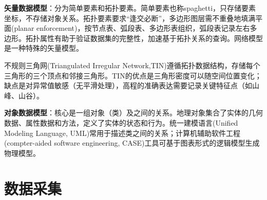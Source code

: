 \par \textbf{矢量数据模型}：分为简单要素和拓扑要素。简单要素也称spaghetti，只存储要素坐标，不存储对象关系。拓扑要素要求``逢交必断''，多边形图层需不重叠地填满平面(planar enforcement)，按节点表、弧段表、多边形表组织，弧段表记录左右多边形。拓扑属性有助于验证数据集的完整性，加速基于拓扑关系的查询。网络模型是一种特殊的矢量模型。
\par 不规则三角网(Triangulated Irregular Network,TIN)遵循拓扑数据结构，存储每个三角形的三个顶点和邻接三角形。TIN的优点是三角形密度可以随空间位置变化；缺点是对异常值敏感（无平滑处理），高程的准确表达需要记录关键特征点（如山峰、山谷）。

\par \textbf{对象数据模型}：核心是一组对象（类）及之间的关系。地理对象集合了实体的几何数据、属性数据和方法，定义了实体的状态和行为。统一建模语言(Unified Modeling Language, UML)常用于描述类之间的关系；计算机辅助软件工程(compter-aided software engineering, CASE)工具可基于图表形式的逻辑模型生成物理模型。

\section{数据采集}



